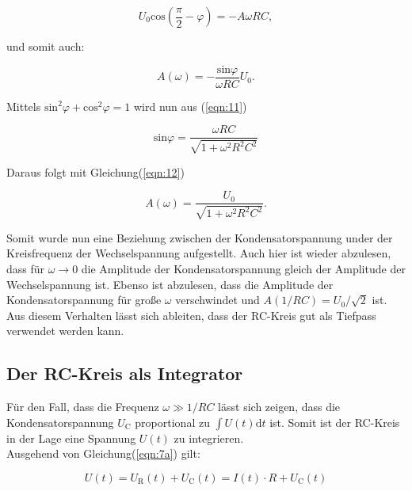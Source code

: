         \begin{equation*}
            U_0 \text{cos}(\frac{\pi}{2} - \varphi) = -A \omega R C ,
        \end{equation*}

        \noindent und somit auch:

        \begin{equation}
            A(\omega) = - \frac{\text{sin} \varphi}{\omega R C} U_0 .
            \label{eqn:12}
        \end{equation}

        \noindent Mittels $\text{sin}^2 \varphi + \text{cos}^2 \varphi = 1$ wird nun aus (\ref{eqn:11}) 

        \begin{equation*}
            \text{sin} \varphi = \frac{\omega R C}{ \sqrt{1 + \omega^2 R^2 C^2} }
        \end{equation*}

        \noindent Daraus folgt mit Gleichung(\ref{eqn:12})

        \begin{equation*}
            A(\omega) = \frac{U_0}{\sqrt{1 + \omega^2 R^2 C^2}} .
        \end{equation*}

        \noindent Somit wurde nun eine Beziehung zwischen der Kondensatorspannung under der Kreisfrequenz der Wechselspannung aufgestellt. Auch 
        hier ist wieder abzulesen, dass für $\omega \rightarrow 0$ die Amplitude der Kondensatorspannung gleich der Amplitude der Wechselspannung ist.
        Ebenso ist abzulesen, dass die Amplitude der Kondensatorspannung für große $\omega$ verschwindet und $A(1/RC) = U_0 / \sqrt{2}$ ist. \\
        Aus diesem Verhalten lässt sich ableiten, dass der RC-Kreis gut als Tiefpass verwendet werden kann.

    \subsection{Der RC-Kreis als Integrator}

        \noindent Für den Fall, dass die Frequenz $\omega \gg 1/RC$ lässt sich zeigen, dass die Kondensatorspannung $U_{\text{C}}$ proportional 
        zu $\int U(t) \text{d}t$ ist. Somit ist der RC-Kreis in der Lage eine Spannung $U(t)$ zu integrieren.\\
        Ausgehend von Gleichung(\ref{eqn:7a}) gilt:

        \begin{equation*}
            U(t) = U_{\text{R}}(t) + U_{\text{C}}(t) = I(t) \cdot R + U_{\text{C}}(t)
        \end{equation*}

